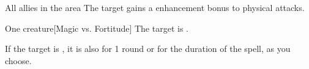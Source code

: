 \begin{spellheader}
\end{spellheader}
\begin{spelleffects}
    \begin{spelltargets}{All allies in the area}
        \spelleffect The target gains a  enhancement bonus to physical attacks. \spellbonusscalingdescription
    \end{spelltargets}
\end{spelleffects}

\begin{spellheader}
    \spellrng{\rngmed}
    \spelldur{\durshort \dismissable}
\end{spellheader}
\begin{spelleffects}
    \begin{spelltarget}{One creature}[Magic vs. Fortitude]
        \spellsuccess The target is \sickened.

        If the target is \bloodied, it is also \blinded for 1 round or \deafened for the duration of the spell, as you choose.
    \end{spelltarget}
\end{spelleffects}

